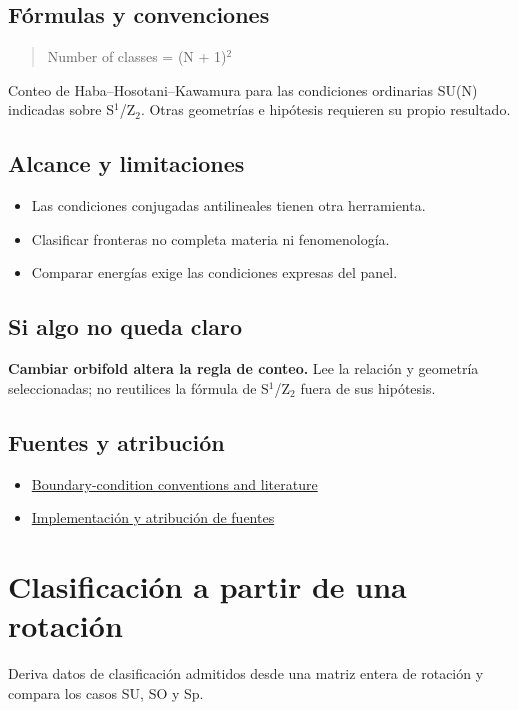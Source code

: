 \documentclass[11pt,a4paper]{article}
\begin{document}
\subsection*{Fórmulas y convenciones}
\begin{quote}Number of classes = (N + 1)\ensuremath{{}^{2}}\end{quote}
Conteo de Haba--Hosotani--Kawamura para las condiciones ordinarias SU(N) indicadas sobre S\ensuremath{{}^{1}}/Z\ensuremath{{}_{2}}. Otras geometrías e hipótesis requieren su propio resultado.

\subsection*{Alcance y limitaciones}
\begin{itemize}
\item Las condiciones conjugadas antilineales tienen otra herramienta.
\item Clasificar fronteras no completa materia ni fenomenología.
\item Comparar energías exige las condiciones expresas del panel.
\end{itemize}
\subsection*{Si algo no queda claro}
\textbf{Cambiar orbifold altera la regla de conteo.} Lee la relación y geometría seleccionadas; no reutilices la fórmula de S\ensuremath{{}^{1}}/Z\ensuremath{{}_{2}} fuera de sus hipótesis.

\subsection*{Fuentes y atribución}
\begin{itemize}
\item \href{https://karlesmarin.github.io/ghu-explorer/docs/index.html}{Boundary-condition conventions and literature}
\item \href{https://github.com/karlesmarin/ghu-lab/blob/main/src/sections/bcclass_section.js}{Implementación y atribución de fuentes}
\end{itemize}
\section{Clasificación a partir de una rotación}
Deriva datos de clasificación admitidos desde una matriz entera de rotación y compara los casos SU, SO y Sp.
\end{document}
